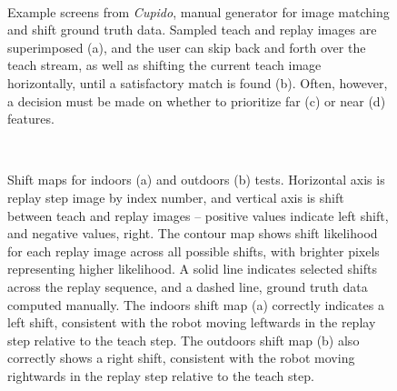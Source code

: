 \documentclass[twocolumn, 9pt,fleqn]{jsproceedings}
\begin{document}
\begin{figure}[h]
\centering
{}%
\hspace{0.1\columnwidth}%
\\
%
\hspace{0.1\columnwidth}%
\caption{Example screens from \textit{Cupido}, manual generator for image matching and shift ground truth data. Sampled teach and replay images are superimposed (a), and the user can skip back and forth over the teach stream, as well as shifting the current teach image horizontally, until a satisfactory match is found (b). Often, however, a decision must be made on whether to prioritize far (c) or near (d) features.}
\label{fig:cupido}
\end{figure}

\begin{figure}[t]
\\
\caption{Shift maps for indoors (a) and outdoors (b) tests. Horizontal axis is replay step image by index number, and vertical axis is shift between teach and replay images -- positive values indicate left shift, and negative values, right. The contour map shows shift likelihood for each replay image across all possible shifts, with brighter pixels representing higher likelihood. A solid line indicates selected shifts across the replay sequence, and a dashed line, ground truth data computed manually. The indoors shift map (a) correctly indicates a left shift, consistent with the robot moving leftwards in the replay step relative to the teach step. The outdoors shift map (b) also correctly shows a right shift, consistent with the robot moving rightwards in the replay step relative to the teach step.}
\label{fig:shift_maps}
\end{figure}
\end{document}
